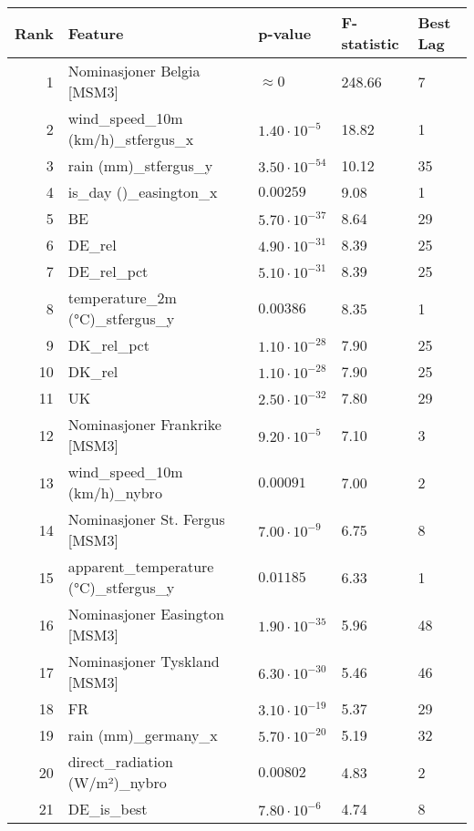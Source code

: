 \begin{table}[H]
    \centering
    \small
    \begin{tabular}{r l l l l}
        \hline
        \textbf{Rank} & \textbf{Feature} & \textbf{p-value} & \textbf{F-statistic} & \textbf{Best Lag} \\
        \hline
        1 & Nominasjoner Belgia [MSM3] & $\approx 0$ & 248.66 & 7 \\
        2 & wind\_speed\_10m (km/h)\_stfergus\_x & $1.40 \cdot 10^{-5}$ & 18.82 & 1 \\
        3 & rain (mm)\_stfergus\_y & $3.50 \cdot 10^{-54}$ & 10.12 & 35 \\
        4 & is\_day ()\_easington\_x & $0.00259$ & 9.08 & 1 \\
        5 & BE & $5.70 \cdot 10^{-37}$ & 8.64 & 29 \\
        6 & DE\_rel & $4.90 \cdot 10^{-31}$ & 8.39 & 25 \\
        7 & DE\_rel\_pct & $5.10 \cdot 10^{-31}$ & 8.39 & 25 \\
        8 & temperature\_2m (°C)\_stfergus\_y & $0.00386$ & 8.35 & 1 \\
        9 & DK\_rel\_pct & $1.10 \cdot 10^{-28}$ & 7.90 & 25 \\
        10 & DK\_rel & $1.10 \cdot 10^{-28}$ & 7.90 & 25 \\
        11 & UK & $2.50 \cdot 10^{-32}$ & 7.80 & 29 \\
        12 & Nominasjoner Frankrike [MSM3] & $9.20 \cdot 10^{-5}$ & 7.10 & 3 \\
        13 & wind\_speed\_10m (km/h)\_nybro & $0.00091$ & 7.00 & 2 \\
        14 & Nominasjoner St. Fergus [MSM3] & $7.00 \cdot 10^{-9}$ & 6.75 & 8 \\
        15 & apparent\_temperature (°C)\_stfergus\_y & $0.01185$ & 6.33 & 1 \\
        16 & Nominasjoner Easington [MSM3] & $1.90 \cdot 10^{-35}$ & 5.96 & 48 \\
        17 & Nominasjoner Tyskland [MSM3] & $6.30 \cdot 10^{-30}$ & 5.46 & 46 \\
        18 & FR & $3.10 \cdot 10^{-19}$ & 5.37 & 29 \\
        19 & rain (mm)\_germany\_x & $5.70 \cdot 10^{-20}$ & 5.19 & 32 \\
        20 & direct\_radiation (W/m²)\_nybro & $0.00802$ & 4.83 & 2 \\
        21 & DE\_is\_best & $7.80 \cdot 10^{-6}$ & 4.74 & 8 \\

\end{tabular}
\end{table}
